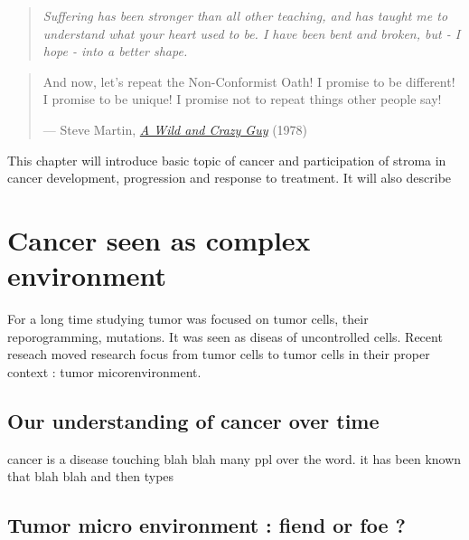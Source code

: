 \documentclass[12pt,]{book}
\theoremstyle{definition}
\theoremstyle{definition}
\theoremstyle{definition}
\theoremstyle{remark}
\begin{document}
\setcounter{page}{11}\vspace*{\fill}

\begin{quote}
 \emph{Suffering has been stronger than all other teaching, and has taught me to understand what your heart used to be. I have been bent and broken, but - I hope - into a better shape.}
 \end{quote}

\vspace*{\fill}

\begin{quote}
And now, let's repeat the Non-Conformist Oath! I promise to be
different! I promise to be unique! I promise not to repeat things other
people say!

--- Steve Martin,
\href{https://en.wikipedia.org/wiki/A_Wild_and_Crazy_Guy}{\emph{A Wild
and Crazy Guy}} (1978)
\end{quote}

This chapter will introduce basic topic of cancer and participation of
stroma in cancer development, progression and response to treatment. It
will also describe

\hypertarget{cancer-seen-as-complex-environment}{%
\section{Cancer seen as complex
environment}\label{cancer-seen-as-complex-environment}}

For a long time studying tumor was focused on tumor cells, their
reporogramming, mutations. It was seen as diseas of uncontrolled cells.
Recent reseach moved research focus from tumor cells to tumor cells in
their proper context : tumor micorenvironment.

\hypertarget{our-understanding-of-cancer-over-time}{%
\subsection{Our understanding of cancer over
time}\label{our-understanding-of-cancer-over-time}}

cancer is a disease touching blah blah many ppl over the word. it has
been known that blah blah and then types

\hypertarget{tumor-micro-environment-fiend-or-foe}{%
\subsection{Tumor micro environment : fiend or foe
?}\label{tumor-micro-environment-fiend-or-foe}}
\end{document}
